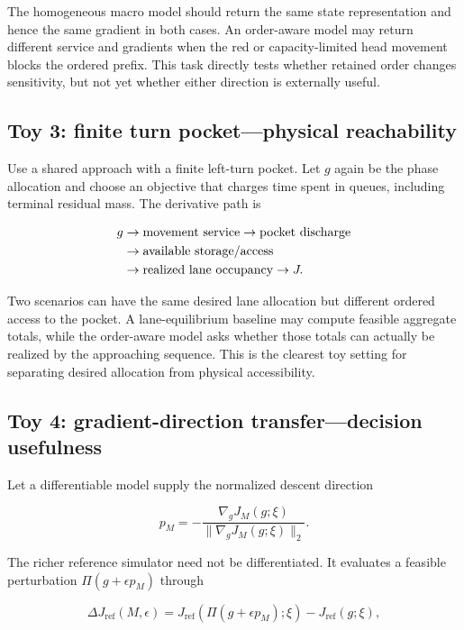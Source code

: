 \documentclass[11pt,a4paper]{article}
\begin{document}
The homogeneous macro model should return the same state representation and hence the same gradient in both cases. An order-aware model may return different service and gradients when the red or capacity-limited head movement blocks the ordered prefix. This task directly tests whether retained order changes sensitivity, but not yet whether either direction is externally useful.

\subsection{Toy 3: finite turn pocket---physical reachability}

Use a shared approach with a finite left-turn pocket. Let $g$ again be the phase allocation and choose an objective that charges time spent in queues, including terminal residual mass. The derivative path is

\begin{align}
g &\rightarrow \text{movement service} \rightarrow \text{pocket discharge} \notag\\
  &\rightarrow \text{available storage/access} \notag\\
  &\rightarrow \text{realized lane occupancy} \rightarrow J.
\end{align}

Two scenarios can have the same desired lane allocation but different ordered access to the pocket. A lane-equilibrium baseline may compute feasible aggregate totals, while the order-aware model asks whether those totals can actually be realized by the approaching sequence. This is the clearest toy setting for separating desired allocation from physical accessibility.

\subsection{Toy 4: gradient-direction transfer---decision usefulness}

Let a differentiable model supply the normalized descent direction

\begin{equation}
  p_M=-\frac{\nabla_gJ_M(g;\xi)}{\|\nabla_gJ_M(g;\xi)\|_2}.
\end{equation}

The richer reference simulator need not be differentiated. It evaluates a feasible perturbation $\Pi(g+\epsilon p_M)$ through

\begin{equation}
  \Delta J_{\mathrm{ref}}(M,\epsilon)=
  J_{\mathrm{ref}}\!\left(\Pi(g+\epsilon p_M);\xi\right)
  -J_{\mathrm{ref}}(g;\xi),
\end{equation}
\end{document}
